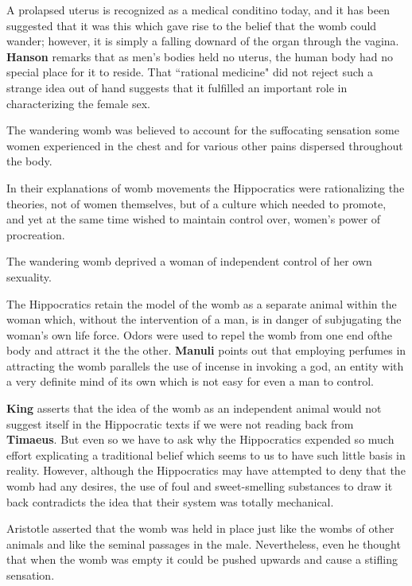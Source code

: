 A prolapsed uterus is recognized as a medical conditino today, and it has been suggested that it was this which gave rise to the belief that the womb could wander; however, it is simply a falling downard of the organ through the vagina. \textbf{Hanson} remarks that as men's bodies held no uterus, the human body had no special place for it to reside. That ``rational medicine" did not reject such a strange idea out of hand suggests that it fulfilled an important role in characterizing the female sex.

\begin{rmk}
    The wandering womb was believed to account for the suffocating sensation some women experienced in the chest and for various other pains dispersed throughout the body. 
\end{rmk}

In their explanations of womb movements the Hippocratics were rationalizing the theories, not of women themselves, but of a culture which needed to promote, and yet at the same time wished to maintain control over, women's power of procreation. 

\begin{rmk}
    The wandering womb deprived a woman of independent control of her own sexuality.
\end{rmk}

The Hippocratics retain the model of the womb as a separate animal within the woman which, without the intervention of a man, is in danger of subjugating the woman's own life force. Odors were used to repel the womb from one end ofthe body and attract it the the other. \textbf{Manuli} points out that employing perfumes in attracting the womb parallels the use of incense in invoking a god, an entity with a very definite mind of its own which is not easy for even a man to control.

\textbf{King} asserts that the idea of the womb as an independent animal would not suggest itself in the Hippocratic texts if we were not reading back from \textbf{Timaeus}. But even so we have to ask why the Hippocratics expended so much effort explicating a traditional belief which seems to us to have such little basis in reality. However, although the Hippocratics may have attempted to deny that the womb had any desires, the use of foul and sweet-smelling substances to draw it back contradicts the idea that their system was totally mechanical. 

Aristotle asserted that the womb was held in place just like the wombs of other animals and like the seminal passages in the male. Nevertheless, even he thought that when the womb was empty it could be pushed upwards and cause a stifling sensation.

